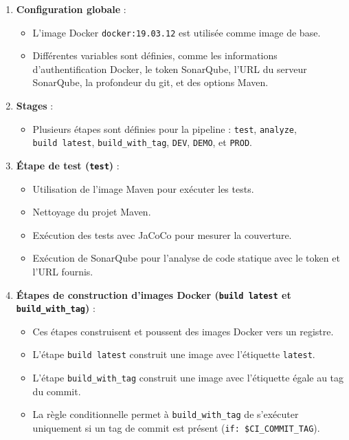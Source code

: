 \documentclass[a4paper, 11pt]{report}
\begin{document}
\begin{enumerate}
\def\labelenumi{\arabic{enumi}.}
\tightlist
\item
  \textbf{Configuration globale} :
  \begin{itemize}
  \tightlist
  \item
    L'image Docker \texttt{docker:19.03.12} est utilisée comme image de
    base.
  \item
    Différentes variables sont définies, comme les informations
    d'authentification Docker, le token SonarQube, l'URL du serveur
    SonarQube, la profondeur du git, et des options Maven.
  \end{itemize}
\item
  \textbf{Stages} :
  \begin{itemize}
  \tightlist
  \item
    Plusieurs étapes sont définies pour la pipeline : \texttt{test},
    \texttt{analyze}, \texttt{build\ latest}, \texttt{build\_with\_tag},
    \texttt{DEV}, \texttt{DEMO}, et \texttt{PROD}.
  \end{itemize}
\item
  \textbf{Étape de test (\texttt{test})} :
  \begin{itemize}
  \tightlist
  \item
    Utilisation de l'image Maven pour exécuter les tests.
  \item
    Nettoyage du projet Maven.
  \item
    Exécution des tests avec JaCoCo pour mesurer la couverture.
  \item
    Exécution de SonarQube pour l'analyse de code statique avec le token
    et l'URL fournis.
  \end{itemize}
\item
  \textbf{Étapes de construction d'images Docker (\texttt{build\ latest}
  et \texttt{build\_with\_tag})} :
  \begin{itemize}
  \tightlist
  \item
    Ces étapes construisent et poussent des images Docker vers un
    registre.
  \item
    L'étape \texttt{build\ latest} construit une image avec l'étiquette
    \texttt{latest}.
  \item
    L'étape \texttt{build\_with\_tag} construit une image avec
    l'étiquette égale au tag du commit.
  \item
    La règle conditionnelle permet à \texttt{build\_with\_tag} de
    s'exécuter uniquement si un tag de commit est présent
    (\texttt{if:\ \textquotesingle{}\$CI\_COMMIT\_TAG\textquotesingle{}}).

\end{itemize}
\end{enumerate}
\end{document}
